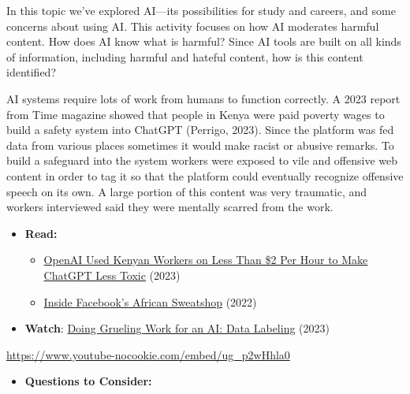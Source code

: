 \documentclass[
  letterpaper,
  DIV=11,
  numbers=noendperiod]{scrreprt}
\providecommand{\tightlist}{%
  \setlength{\itemsep}{0pt}\setlength{\parskip}{0pt}}\usepackage{longtable,booktabs,array}
\begin{document}
\begin{tcolorbox}[enhanced jigsaw, toprule=.15mm, colback=white, colframe=quarto-callout-note-color-frame, bottomtitle=1mm, leftrule=.75mm, coltitle=black, titlerule=0mm, rightrule=.15mm, colbacktitle=quarto-callout-note-color!10!white, left=2mm, title={Learning Activity}, opacitybacktitle=0.6, opacityback=0, breakable, toptitle=1mm, arc=.35mm, bottomrule=.15mm]

In this topic we've explored AI---its possibilities for study and
careers, and some concerns about using AI. This activity focuses on how
AI moderates harmful content. How does AI know what is harmful? Since AI
tools are built on all kinds of information, including harmful and
hateful content, how is this content identified?

AI systems require lots of work from humans to function correctly. A
2023 report from Time magazine showed that people in Kenya were paid
poverty wages to build a safety system into ChatGPT (Perrigo, 2023).
Since the platform was fed data from various places sometimes it would
make racist or abusive remarks. To build a safeguard into the system
workers were exposed to vile and offensive web content in order to tag
it so that the platform could eventually recognize offensive speech on
its own. A large portion of this content was very traumatic, and workers
interviewed said they were mentally scarred from the work.

\begin{itemize}
\tightlist
\item
  \textbf{Read:}

  \begin{itemize}
  \tightlist
  \item
    \href{https://time.com/6247678/openai-chatgpt-kenya-workers/}{OpenAI
    Used Kenyan Workers on Less Than \$2 Per Hour to Make ChatGPT Less
    Toxic} (2023)
  \item
    \href{https://time.com/6147458/facebook-africa-content-moderation-employee-treatment/}{Inside
    Facebook's African Sweatshop} (2022)
  \end{itemize}
\item
  \textbf{Watch}:
  \href{https://www.youtube.com/watch?v=ug_p2wHhla0}{Doing Grueling Work
  for an AI: Data Labeling} (2023)
\end{itemize}

\url{https://www.youtube-nocookie.com/embed/ug_p2wHhla0}

\begin{itemize}
\tightlist
\item
  \textbf{Questions to Consider:}


\end{itemize}
\end{tcolorbox}
\end{document}
